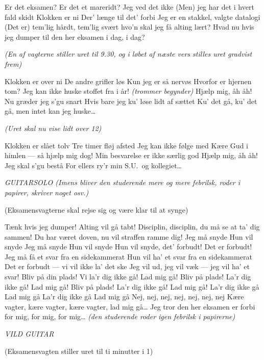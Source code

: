 \documentclass{article}
\begin{document}
\begin{song}
Er det eksamen?
Er det et mareridt?
Jeg ved det ikke
(Men) jeg har det i hvert fald skidt
Klokken er ni
Der' længe til det' forbi
Jeg er en stakkel, valgte datalogi
(Det er) tem'lig hårdt, tem'lig svært
hvo'n skal jeg få alting lært?
Hvad nu hvis jeg dumper til den her eksamen i dag, i dag?

{\em (En af vagterne stiller uret til 9.30, og %
i løbet af næste vers stilles uret gradvist frem)}

Klokken er over ni
De andre grifler løs
Kun jeg er så nervøs
Hvorfor er hjernen tom? 
Jeg kan ikke huske stoffet fra i år! {\em (trommer begynder)}
Hjælp mig, åh åh!
Nu græder jeg s'gu snart
Hvis bare jeg ku' løse lidt af sættet
Ku' det gå, ku' det gå, men intet kan jeg huske\dots

{\em (Uret skal nu vise lidt over 12)}

Klokken er slået tolv
Tre timer fløj afsted
Jeg kan ikke følge med
Kære Gud i himlen --- så hjælp mig dog!
Min besvarelse er ikke særlig god
Hjælp mig, åh åh!
Jeg skal s'gu bestå
For ellers ry'r min S.U.\ og kollegiet\dots

{\em GUITARSOLO (Imens bliver den studerende mere og mere %
febrilsk, roder i papirer, skriver noget osv.)

(Eksamensvagterne skal rejse sig og være klar til at synge)}

Tænk hvis jeg dumper! Alting vil gå tabt!
 Disciplin, disciplin, du må se at ta' dig sammen!
 Du har været doven, nu vil straffen ramme dig!
Jeg må snyde 
 Hun vil snyde
Jeg må snyde 
 Hun vil snyde
 Hun vil snyde, det' forbudt! Det er forbudt!
Jeg må få et svar fra en sidekammerat
 Hun vil ha' et svar fra en sidekammerat
 Det er forbudt --- vi vil ikke la' det ske
Jeg vil ud, jeg vil væk --- jeg vil ha' et svar!
 Bliv på din plads! Vi la'r dig ikke gå! 
Lad mig gå!
 Bliv på plads! La'r dig ikke gå! 
Lad mig gå!
 Bliv på plads! La'r dig ikke gå! 
Lad mig gå!
 La'r dig ikke gå
Lad mig gå
 La'r dig ikke gå 
Lad mig gå
 Nej, nej, nej, nej, nej, nej, nej 
Kære vagter, kære vagter, kære vagter, lad mig gå\dots
Jeg tror den her eksamen er forbi for mig, for mig, for mig\dots
{\em (den studerende roder igen febrilsk i papirerne)}

{\em VILD GUITAR

(Eksamensvagten stiller uret til ti minutter i 1)}


\end{song}
\end{document}
